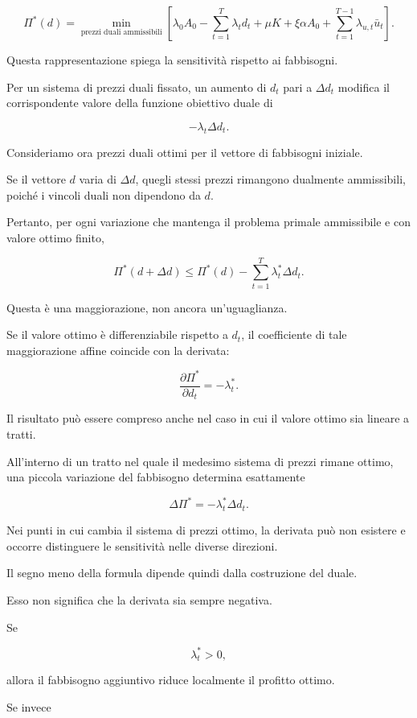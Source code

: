\[
\Pi^*(d)
=
\min_{\text{prezzi duali ammissibili}}
\left[
\lambda_0 A_0
-\sum_{t=1}^{T}\lambda_t d_t
+\mu K+\xi\alpha A_0
+\sum_{t=1}^{T-1}\lambda_{u,t}\bar u_t
\right].
\]

Questa rappresentazione spiega
la sensitivit\`{a} rispetto ai fabbisogni.

Per un sistema di prezzi duali fissato,
un aumento di $d_t$ pari a $\Delta d_t$
modifica il corrispondente valore
della funzione obiettivo duale di

\[
-\lambda_t\Delta d_t.
\]

Consideriamo ora prezzi duali ottimi
per il vettore di fabbisogni iniziale.

Se il vettore $d$ varia di $\Delta d$,
quegli stessi prezzi rimangono dualmente
ammissibili, poich\'{e} i vincoli
duali non dipendono da $d$.

Pertanto, per ogni variazione che
mantenga il problema primale
ammissibile e con valore ottimo finito,

\[
\Pi^*(d+\Delta d)
\leq
\Pi^*(d)
-\sum_{t=1}^{T}\lambda_t^*\Delta d_t.
\]

Questa \`{e} una maggiorazione,
non ancora un'uguaglianza.

Se il valore ottimo \`{e}
differenziabile rispetto a $d_t$,
il coefficiente di tale maggiorazione
affine coincide con la derivata:

\[
\boxed{
\frac{\partial\Pi^*}{\partial d_t}
=
-\lambda_t^*.
}
\]

Il risultato pu\`{o} essere compreso
anche nel caso in cui il valore
ottimo sia lineare a tratti.

All'interno di un tratto nel quale
il medesimo sistema di prezzi rimane
ottimo, una piccola variazione
del fabbisogno determina esattamente

\[
\Delta\Pi^*
=
-\lambda_t^*\Delta d_t.
\]

Nei punti in cui cambia il sistema
di prezzi ottimo, la derivata pu\`{o}
non esistere e occorre distinguere
le sensitivit\`{a} nelle diverse direzioni.

Il segno meno della formula dipende
quindi dalla costruzione del duale.

Esso non significa che la derivata
sia sempre negativa.

Se

\[
\lambda_t^*>0,
\]

\noindent allora il fabbisogno aggiuntivo
riduce localmente il profitto ottimo.

Se invece

